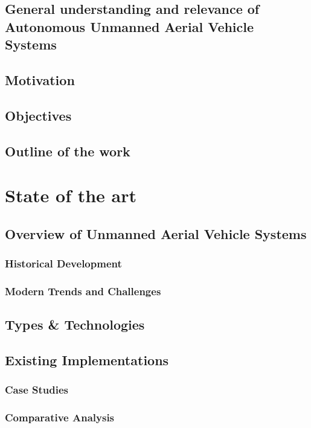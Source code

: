 \documentclass[oneside, 12pt, a4paper, draft]{book}
\begin{document}
\chapter{General understanding and relevance of Autonomous Unmanned Aerial Vehicle Systems}
\label{sec:org737ee99}
\chapter{Motivation}
\label{sec:org8b85966}
\chapter{Objectives}
\label{sec:org05efed8}
\chapter{Outline of the work}
\label{sec:orga816359}
\part{State of the art}
\label{sec:org852bda4}
\chapter{Overview of Unmanned Aerial Vehicle Systems}
\label{sec:org2087377}

\section{Historical Development}
\label{sec:org197c0a5}
\section{Modern Trends and Challenges}
\label{sec:org3dcc1bc}
\chapter{Types \& Technologies}
\label{sec:org659468c}
\chapter{Existing Implementations}
\label{sec:orgaac826e}
\section{Case Studies}
\label{sec:org67814b0}
\section{Comparative Analysis}
\label{sec:org70a7c5a}
\end{document}
